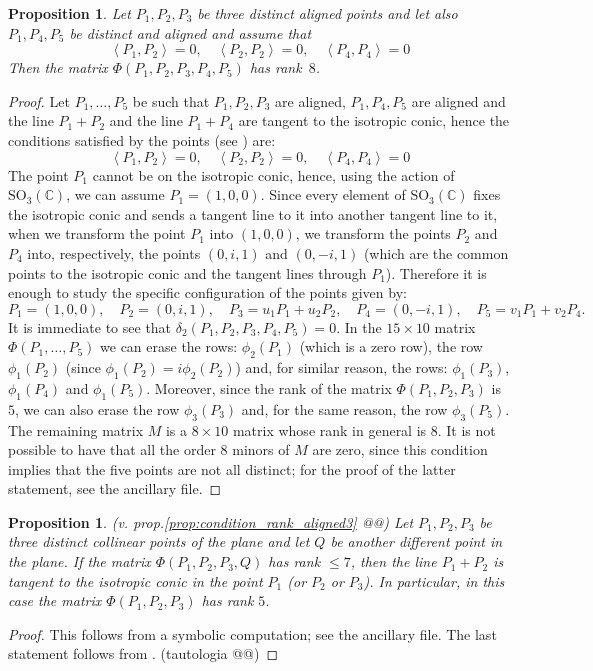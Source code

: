 \documentclass[12pt, a4paper, reqno, captions=tableheading,bibliography=totoc]{scrartcl}
\theoremstyle{plain}
\newtheorem{prop}[lemma]{Proposition}
\theoremstyle{definition}
\newcommand{\scl}[2]{\left\langle {#1}, {#2} \right\rangle}
\begin{document}
\begin{prop}
Let $P_1, P_2, P_3$ be three distinct aligned points and let also $P_1, P_4, P_5$
be distinct and aligned and assume that
\[
\scl{P_1}{P_2}=0, \quad \scl{P_2}{P_2}=0, \quad \scl{P_4}{P_4}=0
\]
Then the matrix $\Phi(P_1, P_2, P_3, P_4, P_5)$ has rank~$8$.
\label{prop:frecciaFissata}
\end{prop}
\begin{proof}
Let $P_1, \dots, P_5$ be such that $P_1, P_2, P_3$ are aligned,
$P_1, P_4, P_5$ are aligned and the line $P_1+P_2$ and the line
$P_1+P_4$ are tangent to the isotropic conic, hence
the conditions satisfied by the points (see ) are:
\[
\scl{P_1}{P_2}=0, \quad \scl{P_2}{P_2}=0, \quad \scl{P_4}{P_4}=0
\]
The point $P_1$ cannot be on the isotropic conic, hence, using the
action of $\mathrm{SO}_3(\mathbb{C})$, we can assume $P_1 = (1, 0, 0)$.
Since every element of $\mathrm{SO}_3(\mathbb{C})$ fixes the
isotropic conic and sends a tangent line to it into another
tangent line to it, when we transform the point $P_1$
into $(1, 0, 0)$, we transform the points $P_2$ and $P_4$ into, respectively,
the points $(0, i, 1)$ and $(0, -i, 1)$ (which are the common points to
the isotropic conic and the tangent lines through $P_1$).
Therefore it is enough to study the
specific configuration of the points given by:
\[
P_1 = (1, 0, 0), \quad P_2=(0, i, 1), \quad P_3=u_1P_1+u_2P_2, \quad
P_4= (0, -i, 1), \quad P_5 = v_1P_1+v_2P_4.
\]
It is immediate to see that $\delta_2(P_1, P_2, P_3, P_4, P_5) = 0$.
In the $15\times 10$ matrix $\Phi(P_1, \dots, P_5)$ we can erase the
rows: $\phi_2(P_1)$ (which is a zero row), the row $\phi_1(P_2)$
(since $\phi_1(P_2)=i\phi_2(P_2)$) and, for similar reason, the
rows: $\phi_1(P_3)$, $\phi_1(P_4)$ and $\phi_1(P_5)$.
Moreover, since the rank of the matrix $\Phi(P_1, P_2, P_3)$ is $5$,
we can also erase the row $\phi_3(P_3)$ and, for the same reason, the
row $\phi_3(P_5)$. The remaining matrix $M$ is a $8\times 10$ matrix whose rank
in general is $8$. It is not possible to have that all the order $8$ minors
of $M$ are zero, since this condition implies that the five points
are not all distinct; for the proof of the latter statement, see the ancillary file.
\end{proof}

\begin{prop} (v. prop.\ref{prop:condition_rank_aligned3} @@)
\label{prop:condition3+1}
  Let $P_1, P_2, P_3$ be three distinct collinear points of the
  plane and let $Q$ be another different point in the plane.
  If the matrix $\Phi(P_1, P_2, P_3, Q)$ has rank $\leq 7$,
  then the line $P_1+P_2$ is tangent to the isotropic conic in the point
  $P_1$ (or $P_2$ or $P_3$).
  In particular, in this case the matrix $\Phi(P_1, P_2, P_3)$
  has rank $5$.
\end{prop}
\begin{proof}
 This follows from a symbolic computation; see the ancillary file.
 The last statement follows from . (tautologia @@)
\end{proof}
\end{document}
